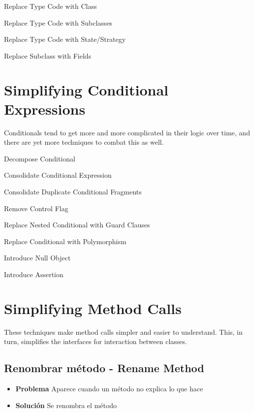 \documentclass[11pt,a4paper,oneside]{book}
\begin{document}
    Replace Type Code with Class
    
    Replace Type Code with Subclasses
    
    Replace Type Code with State/Strategy
    
    Replace Subclass with Fields




\section{Simplifying Conditional Expressions}

Conditionals tend to get more and more complicated in their logic over time, and there are yet more techniques to combat this as well.

    Decompose Conditional
    
    Consolidate Conditional Expression
    
    Consolidate Duplicate Conditional Fragments
    
    Remove Control Flag

    Replace Nested Conditional with Guard Clauses
    
    Replace Conditional with Polymorphism
    
    Introduce Null Object
    
    Introduce Assertion





\section{Simplifying Method Calls}

These techniques make method calls simpler and easier to understand. This, in turn, simplifies the interfaces for interaction between classes.

\subsection{     Renombrar método - Rename Method}
\label{renombrarmetodo}
\begin{itemize}
    \item \textbf{Problema} Aparece cuando un método no explica lo que hace 
    \item \textbf{Solución} Se renombra el método
\end{itemize}
    
%

\end{document}
